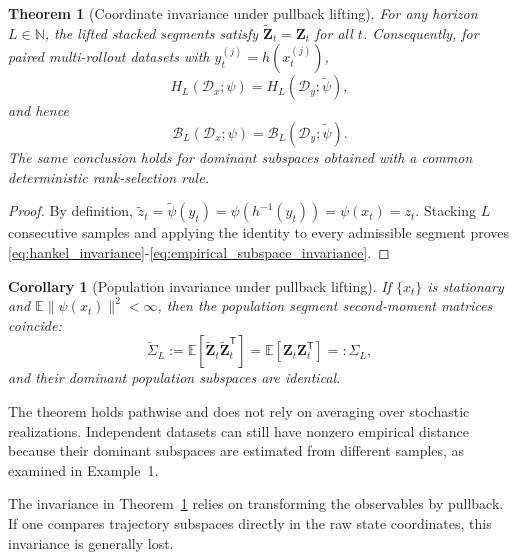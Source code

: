 \documentclass[letterpaper, 10 pt, conference]{ieeeconf}  %
\newtheorem{theorem}{Theorem}
\newtheorem{corollary}{Corollary}
\newcommand{\E}{\mathbb{E}}
\newcommand{\T}{^{\mathsf T}}
\begin{document}
\begin{theorem}[Coordinate invariance under pullback lifting]
\label{thm:stoch_invariance_lifted}
For any horizon $L\in\mathbb N$, the lifted stacked segments satisfy $\widetilde{\mathbf Z}_t=\mathbf Z_t$ for all $t$. Consequently, for paired multi-rollout datasets with $y_t^{(j)}=h(x_t^{(j)})$,
\begin{equation}
  H_L(\mathcal D_x;\psi)=H_L(\mathcal D_y;\widetilde\psi),
  \label{eq:hankel_invariance}
\end{equation}
and hence
\begin{equation}
  \mathcal B_L(\mathcal D_x;\psi)=\mathcal B_L(\mathcal D_y;\widetilde\psi).
  \label{eq:empirical_subspace_invariance}
\end{equation}
The same conclusion holds for dominant subspaces obtained with a common deterministic rank-selection rule.
\end{theorem}

\begin{proof}
By definition, $\widetilde z_t=\widetilde\psi(y_t)=\psi(h^{-1}(y_t))=\psi(x_t)=z_t$. Stacking $L$ consecutive samples and applying the identity to every admissible segment proves \eqref{eq:hankel_invariance}-\eqref{eq:empirical_subspace_invariance}.
\end{proof}

\begin{corollary}[Population invariance under pullback lifting]
\label{cor:population_invariance}
If $\{x_t\}$ is stationary and $\E\|\psi(x_t)\|^2<\infty$, then the population segment second-moment matrices coincide:
\begin{equation}
  \widetilde\Sigma_L:=\E[\widetilde{\mathbf Z}_t\widetilde{\mathbf Z}_t\T]
  =\E[\mathbf Z_t\mathbf Z_t\T]=:\Sigma_L,
  \label{eq:covariance_invariance}
\end{equation}
and their dominant population subspaces are identical.
\end{corollary}

The theorem holds pathwise and does not rely on averaging over stochastic realizations. Independent datasets can still have nonzero empirical distance because their dominant subspaces are estimated from different samples, as examined in Example~1.

The invariance in Theorem~\ref{thm:stoch_invariance_lifted} relies on transforming the observables by pullback. If one compares trajectory subspaces directly in the raw state coordinates, this invariance is generally lost.
\end{document}
